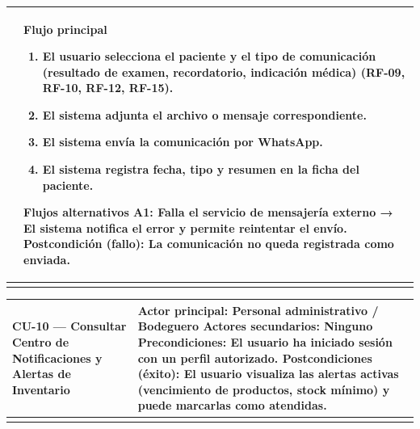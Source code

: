 \documentclass[
]{article}
\newcounter{none} %
\begin{document}
{\def\LTcaptype{none} %
\begin{longtable}[]{@{}
  >{\raggedright\arraybackslash}p{}
  >{\raggedright\arraybackslash}p{}@{}}
\toprule\noalign{}
\begin{minipage}[b]{\linewidth}\raggedright
\end{minipage} & \begin{minipage}[b]{\linewidth}\raggedright
\textbf{Flujo principal}

\begin{enumerate}
\def\labelenumi{\arabic{enumi}.}
\item
  El usuario selecciona el paciente y el tipo de comunicación (resultado
  de examen, recordatorio, indicación médica) (RF-09, RF-10, RF-12,
  RF-15).
\item
  El sistema adjunta el archivo o mensaje correspondiente.
\item
  El sistema envía la comunicación por WhatsApp.
\item
  El sistema registra fecha, tipo y resumen en la ficha del paciente.
\end{enumerate}

\textbf{Flujos alternativos} A1: Falla el servicio de mensajería externo → El sistema notifica el
error y permite reintentar el envío. \textbf{Postcondición (fallo):} La comunicación no queda registrada como
enviada.
\end{minipage} \\
\midrule\noalign{}
\endhead
\bottomrule\noalign{}
\endlastfoot
\end{longtable}
}

{\def\LTcaptype{none} %
\begin{longtable}[]{@{}
  >{\raggedright\arraybackslash}p{}
  >{\raggedright\arraybackslash}p{}@{}}
\toprule\noalign{}
\begin{minipage}[b]{\linewidth}\raggedright
CU-10 --- Consultar Centro de Notificaciones y Alertas de Inventario
\end{minipage} & \begin{minipage}[b]{\linewidth}\raggedright
\textbf{Actor principal:} Personal administrativo / Bodeguero
\textbf{Actores secundarios:} Ninguno \textbf{Precondiciones:} El
usuario ha iniciado sesión con un perfil autorizado. \textbf{Postcondiciones (éxito):} El usuario visualiza las alertas
activas (vencimiento de productos, stock mínimo) y puede marcarlas como
atendidas.
\end{minipage} \\
\midrule\noalign{}
\endhead
\bottomrule\noalign{}
\endlastfoot
\end{longtable}
}
\end{document}

